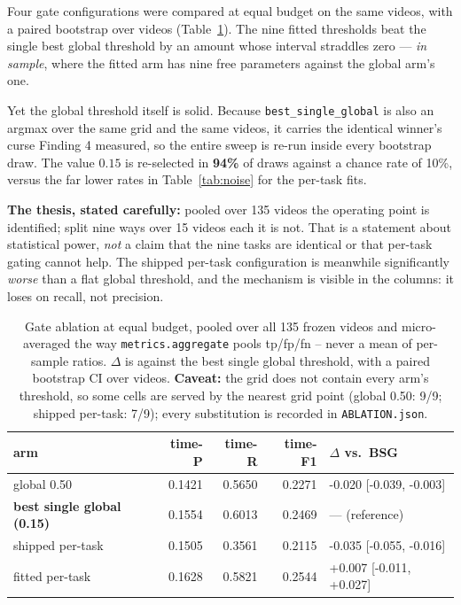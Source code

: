 \documentclass[11pt,a4paper]{article}
\begin{document}
Four gate configurations were compared at equal budget on the same
videos, with a paired bootstrap over videos (Table~\ref{tab:ablation}). The nine
fitted thresholds beat the single best global threshold by an amount whose
interval straddles zero --- \emph{in sample}, where the fitted arm has nine free
parameters against the global arm's one.

Yet the global threshold itself is solid. Because
\texttt{best\_single\_global} is also an argmax over the same grid and the same
videos, it carries the identical winner's curse Finding 4 measured, so the entire
sweep is re-run inside every bootstrap draw. The value $0.15$ is re-selected in
\textbf{94\%} of draws against a chance rate of 10\%, versus the far lower
rates in Table~\ref{tab:noise} for the per-task fits.

\textbf{The thesis, stated carefully:} pooled over 135 videos the
operating point is identified; split nine ways over 15 videos each it is not.
That is a statement about statistical power, \emph{not} a claim that the nine
tasks are identical or that per-task gating cannot help. The shipped per-task
configuration is meanwhile significantly \emph{worse} than a flat global
threshold, and the mechanism is visible in the columns: it loses on recall, not
precision.

\begin{table}[t]\centering\small\caption{Gate ablation at equal budget, pooled over all 135 frozen videos and micro-averaged the way \texttt{metrics.aggregate} pools tp/fp/fn -- never a mean of per-sample ratios. $\Delta$ is against the best single global threshold, with a paired bootstrap CI over videos. \textbf{Caveat:} the grid does not contain every arm's threshold, so some cells are served by the nearest grid point (global 0.50: 9/9; shipped per-task: 7/9); every substitution is recorded in \texttt{ABLATION.json}.}\label{tab:ablation}
\begin{tabular}{lrrrl}\toprule
arm & time-P & time-R & time-F1 & $\Delta$ vs.\ BSG \\\midrule
global 0.50 & 0.1421 & 0.5650 & 0.2271 & -0.020 [-0.039, -0.003] \\
\textbf{best single global (0.15)} & 0.1554 & 0.6013 & 0.2469 & --- (reference) \\
shipped per-task & 0.1505 & 0.3561 & 0.2115 & -0.035 [-0.055, -0.016] \\
fitted per-task & 0.1628 & 0.5821 & 0.2544 & +0.007 [-0.011, +0.027] \\
\bottomrule\end{tabular}\end{table}
\end{document}

